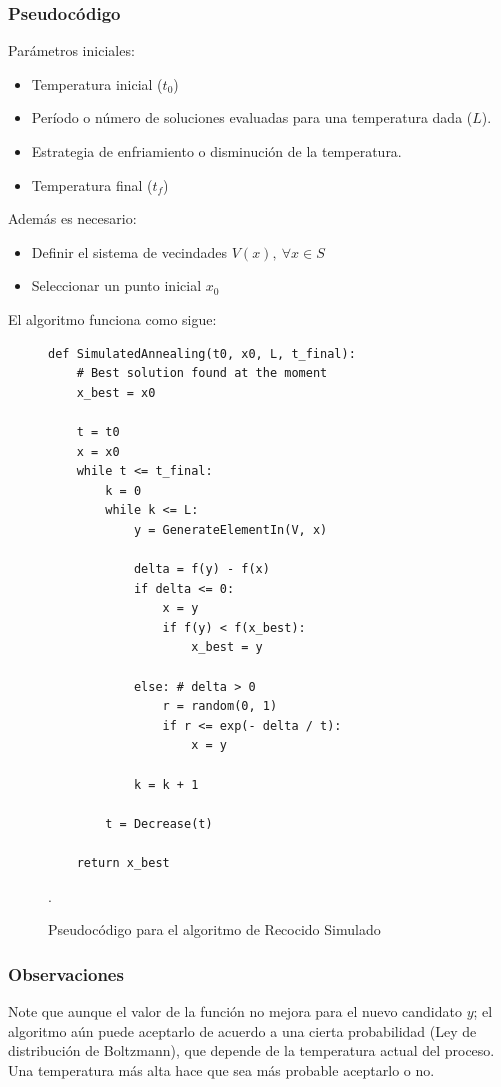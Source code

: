 \documentclass[titlepage, 11pt]{scrartcl}
\begin{document}
	    	\subsubsection{Pseudocódigo}
	    		Parámetros iniciales:
	    		\begin{itemize}
	    			\item Temperatura inicial ($t_0$)
	    			\item Período o número de soluciones evaluadas para una temperatura dada ($L$).
	    			\item Estrategia de enfriamiento o disminución de la temperatura.
	    			\item Temperatura final ($t_f$)
	    		\end{itemize}
    			
    			Además es necesario:
    			\begin{itemize}
    				\item Definir el sistema de vecindades $V(x), \ \forall x \in S$
    				\item Seleccionar un punto inicial $x_0$
    			\end{itemize}
    		
    		El algoritmo funciona como sigue:
    		\begin{figure}[H]
    			\begin{verbatim}
def SimulatedAnnealing(t0, x0, L, t_final):
	# Best solution found at the moment
	x_best = x0 
	
	t = t0
	x = x0
	while t <= t_final:
		k = 0
		while k <= L:
			y = GenerateElementIn(V, x)
			
			delta = f(y) - f(x)
			if delta <= 0:
				x = y
				if f(y) < f(x_best):
					x_best = y
			
			else: # delta > 0
				r = random(0, 1)
				if r <= exp(- delta / t):
					x = y
			
			k = k + 1
		
		t = Decrease(t)
		
	return x_best
			\end{verbatim}
			\caption{Pseudocódigo para el algoritmo de Recocido Simulado}.
		\end{figure}
	
		\subsubsection{Observaciones}
			Note que aunque el valor de la función no mejora para el nuevo candidato $y$; el algoritmo aún puede aceptarlo de acuerdo a una cierta probabilidad (Ley de distribución de Boltzmann), que depende de la temperatura actual del proceso. Una temperatura más alta hace que sea más probable aceptarlo o no.
			
\end{document}

